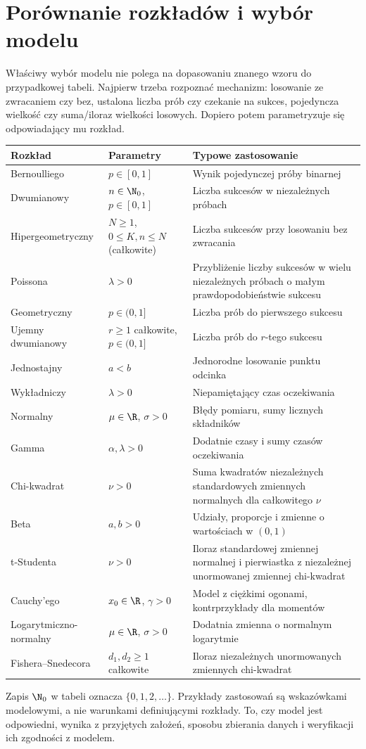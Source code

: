 \section{Porównanie rozkładów i wybór modelu}
Właściwy wybór modelu nie polega na dopasowaniu znanego wzoru
do przypadkowej tabeli. Najpierw trzeba rozpoznać mechanizm:
losowanie ze zwracaniem czy bez, ustalona liczba prób czy czekanie
na sukces, pojedyncza wielkość czy suma/iloraz wielkości losowych.
Dopiero potem parametryzuje się odpowiadający mu rozkład.

\begin{center}
\small
\begin{tabular}{@{}p{3.0cm}p{4.1cm}p{5.9cm}@{}}
\hline
Rozkład & Parametry & Typowe zastosowanie \\
\hline
Bernoulliego & $p\in[0,1]$ & Wynik pojedynczej próby binarnej \\
Dwumianowy & $n\in\N_0$, $p\in[0,1]$ & Liczba sukcesów w niezależnych próbach \\
Hipergeometryczny & $N\geq1$, $0\leq K,n\leq N$ (całkowite) & Liczba sukcesów przy losowaniu bez zwracania \\
Poissona & $\lambda>0$ & Przybliżenie liczby sukcesów w wielu niezależnych próbach o małym prawdopodobieństwie sukcesu \\
Geometryczny & $p\in(0,1]$ & Liczba prób do pierwszego sukcesu \\
Ujemny dwumianowy & $r\geq1$ całkowite, $p\in(0,1]$ & Liczba prób do $r$-tego sukcesu \\
Jednostajny & $a<b$ & Jednorodne losowanie punktu odcinka \\
Wykładniczy & $\lambda>0$ & Niepamiętający czas oczekiwania \\
Normalny & $\mu\in\R$, $\sigma>0$ & Błędy pomiaru, sumy licznych składników \\
Gamma & $\alpha,\lambda>0$ & Dodatnie czasy i sumy czasów oczekiwania \\
Chi-kwadrat & $\nu>0$ & Suma kwadratów niezależnych standardowych zmiennych normalnych dla całkowitego $\nu$ \\
Beta & $a,b>0$ & Udziały, proporcje i zmienne o wartościach w $(0,1)$ \\
t-Studenta & $\nu>0$ & Iloraz standardowej zmiennej normalnej i pierwiastka z niezależnej unormowanej zmiennej chi-kwadrat \\
Cauchy'ego & $x_0\in\R$, $\gamma>0$ & Model z ciężkimi ogonami, kontrprzykłady dla momentów \\
Logarytmiczno-normalny & $\mu\in\R$, $\sigma>0$ & Dodatnia zmienna o normalnym logarytmie \\
Fishera--Snedecora & $d_1,d_2\geq1$ całkowite & Iloraz niezależnych unormowanych zmiennych chi-kwadrat \\
\hline
\end{tabular}
\end{center}

\begin{uwaga}
Zapis $\N_0$ w tabeli oznacza $\{0,1,2,\ldots\}$.
Przykłady zastosowań są wskazówkami modelowymi, a nie
warunkami definiującymi rozkłady. To, czy model jest odpowiedni,
wynika z przyjętych założeń, sposobu zbierania danych
i weryfikacji ich zgodności z modelem.
\end{uwaga}


